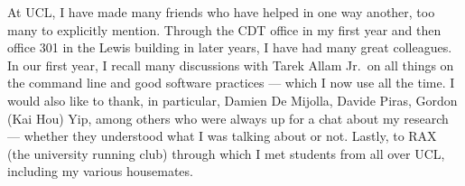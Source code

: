 \begin{acknowledgements}
	At UCL, I have made many friends who have helped in one way another, too many to explicitly mention.
	Through the CDT office in my first year and then office 301 in the Lewis building in later years, I have had many great colleagues.
	In our first year, I recall many discussions with Tarek Allam Jr.\ on all things on the command line and good software practices --- which I now use all the time.
	I would also like to thank, in particular, Damien De Mijolla, Davide Piras, Gordon (Kai Hou) Yip, among others who were always up for a chat about my research --- whether they understood what I was talking about or not.
	Lastly, to RAX (the university running club) through which I met students from all over UCL, including my various housemates.
\end{acknowledgements}

\setcounter{tocdepth}{2}

\tableofcontents
\listoffigures
\listoftables
